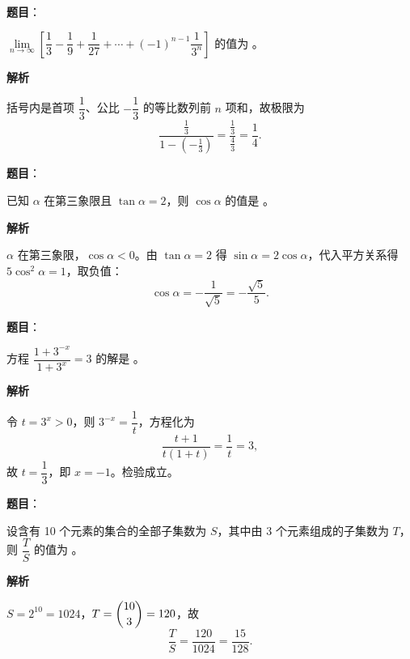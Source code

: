 \begin{answer}

\textbf{题目}：

\(\lim\limits_{n\to\infty}\left[\dfrac{1}{3}-\dfrac{1}{9}+\dfrac{1}{27}+\cdots+(-1)^{n-1}\dfrac{1}{3^n}\right]\) 的值为 \underline{\qquad}。

\textbf{解析}

括号内是首项 \(\dfrac13\)、公比 \(-\dfrac13\) 的等比数列前 \(n\) 项和，故极限为
\nopagebreak[4]
\[
\frac{\frac13}{1-\left(-\frac13\right)}
=\frac{\frac13}{\frac43}=\frac14.
\]


\end{answer}
\begin{answer}

\textbf{题目}：

已知 \(\alpha\) 在第三象限且 \(\tan\alpha=2\)，则 \(\cos\alpha\) 的值是 \underline{\qquad}。

\textbf{解析}

\(\alpha\) 在第三象限，\(\cos\alpha<0\)。由 \(\tan\alpha=2\) 得 \(\sin\alpha=2\cos\alpha\)，代入平方关系得 \(5\cos^2\alpha=1\)，取负值：
\nopagebreak[4]
\[
\cos\alpha=-\frac{1}{\sqrt5}=-\frac{\sqrt5}{5}.
\]


\end{answer}
\begin{answer}

\textbf{题目}：

方程 \(\dfrac{1+3^{-x}}{1+3^x}=3\) 的解是 \underline{\qquad}。

\textbf{解析}

令 \(t=3^x>0\)，则 \(3^{-x}=\dfrac1t\)，方程化为
\nopagebreak[4]
\[
\frac{t+1}{t(1+t)}=\frac1t=3,
\]
故 \(t=\dfrac13\)，即 \(x=-1\)。检验成立。


\end{answer}
\begin{answer}

\textbf{题目}：

设含有 10 个元素的集合的全部子集数为 \(S\)，其中由 3 个元素组成的子集数为 \(T\)，则 $\mbox{\(\dfrac{T}{S}\)}$ 的值为 \underline{\qquad}。

\textbf{解析}

\(S=2^{10}=1024\)，\(T=\dbinom{10}{3}=120\)，故
\nopagebreak[4]
\[
\frac TS=\frac{120}{1024}=\frac{15}{128}.
\]


\end{answer}
